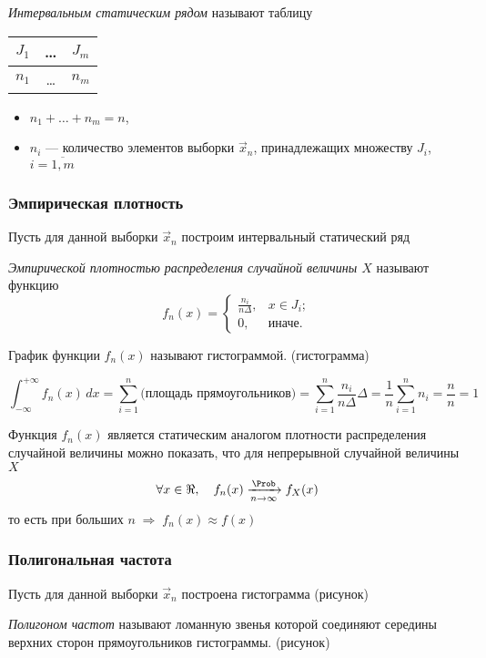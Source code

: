 \begin{defn}
	\emph{Интервальным статическим рядом} называют таблицу
	\begin{center}
			\begin{tabular}{| c | c | c |}
				\hline
				$J_1$ & \ldots & $J_m$ \\
				\hline
				$n_1$ & \ldots & $n_m$ \\
				\hline
			\end{tabular}
	\end{center}
	\begin{itemize}
		\item $n_1 + \dots + n_m = n$,
		\item $n_i$ --- количество элементов выборки $\vec{x}_n$, принадлежащих множеству $J_i$, $i = \overline{1, m}$
	\end{itemize}
\end{defn}


\subsubsection{Эмпирическая плотность}

Пусть для данной выборки $\vec{x}_n$ построим интервальный статический ряд

\begin{defn}
	\emph{Эмпирической плотностью распределения случайной величины $X$} называют функцию
	\begin{equation}
		f_n(x) =
		\begin{cases}
			\frac{n_i}{n \Delta}, &x \in J_i;\\
			0, &\text{иначе}.
		\end{cases}
	\end{equation}
\end{defn}

\begin{defn}
	График функции $f_n(x)$ называют гистограммой. (гистограмма)
\end{defn}

\begin{rem}
	\[
		\int_{-\infty}^{+\infty} f_n(x)\, dx = \sum_{i =1}^{n} \text{(площадь прямоугольников)} = \sum_{i = 1}^{n} \frac{n_i}{n \Delta} \Delta = \frac{1}{n} \sum_{i = 1}^{n} n_i = \frac{n}{n} = 1
	\]
\end{rem}
\begin{rem}
	Функция $f_n(x)$ является статическим аналогом плотности распределения случайной величины можно показать, что для непрерывной случайной величины $X$
	\[
		\forall x \in \Re, \quad f_n(x) \xrightarrow[n\to\infty]{\Prob} f_{X}(x)
	\]
	то есть при больших $n \;\Rightarrow\; f_n(x) \approx f(x)$
\end{rem}


\subsubsection{Полигональная частота}

Пусть для данной выборки $\vec{x}_n$ построена гистограмма (рисунок)

\begin{defn}
	\emph{Полигоном частот} называют ломанную звенья которой соединяют середины верхних сторон прямоугольников гистограммы. (рисунок)
\end{defn}